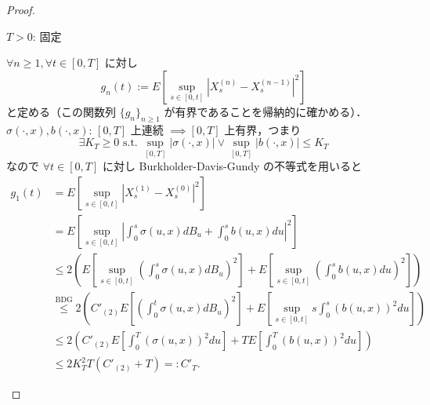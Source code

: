 \documentclass{jsarticle}
\begin{document}
\begin{proof}
\begin{enumerate}[label=(\roman*)]
        $T>0$: 固定

        $\forall n\ge1, \forall t\in[0, T]$ に対し
        $$
        g_n(t)
        := E[\sup_{s\in[0, t]}\left\lvert X_s^{(n)}-X_s^{(n-1)}\right\rvert^2]
        $$
        と定める（この関数列 $\{g_n\}_{n\ge1}$ が有界であることを帰納的に確かめる）．
        $\sigma(\cdot, x), b(\cdot, x)$: $[0, T]$ 上連続 $\implies [0, T]$ 上有界，つまり
        $$
        \exists K_T\ge0\text{ s.t. }\sup_{[0, T]}\left\lvert \sigma(\cdot, x)\right\rvert\vee\sup_{[0, T]}\left\lvert b(\cdot, x)\right\rvert\le K_T
        $$
        なので $\forall t\in[0, T]$ に対し Burkholder-Davis-Gundy の不等式を用いると
        \begin{align}
            g_1(t)
            &= E[\sup_{s\in[0, t]}\left\lvert X_s^{(1)}-X_s^{(0)}\right\rvert^2] \\
            &= E[\sup_{s\in[0, t]}\left\lvert \int_0^s \sigma(u, x)dB_u
            + \int_0^s b(u, x)du\right\rvert^2] \\
            &\le 2(E[\sup_{s\in[0, t]}(\int_0^s \sigma(u, x)dB_u)^2]
            + E[\sup_{s\in[0, t]}(\int_0^s b(u, x)du)^2]) \\
            &\stackrel{\text{BDG}}{\le} 2(C'_{(2)}E[(\int_0^t \sigma(u, x)dB_u)^2]
            + E[\sup_{s\in[0, t]}s\int_0^s (b(u, x))^2du]) \\
            &\le 2(C'_{(2)}E[\int_0^T (\sigma(u, x))^2du]
            + TE[\int_0^T (b(u, x))^2du]) \\
            &\le 2K_T^2T(C'_{(2)}+T)=:C'_T.
        \end{align}


\end{enumerate}
\end{proof}
\end{document}
